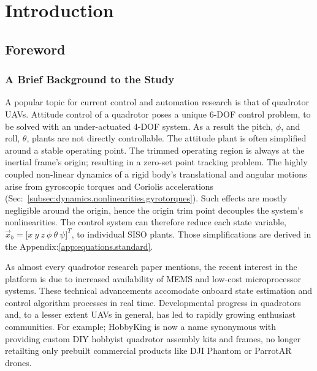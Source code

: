 \chapter{Introduction}
\label{ch:intro}
\section{Foreword}
\label{sec:intro.foreword}
\subsection{A Brief Background to the Study}
\label{subsec:intro.foreword.background}
A popular topic for current control and automation research is that of quadrotor UAVs. Attitude control of a quadrotor poses a unique 6-DOF control problem, to be solved with an under-actuated 4-DOF system. As a result the pitch, $\phi$, and roll, $\theta$, plants are not directly controllable. The attitude plant is often simplified around a stable operating point. The trimmed operating region is always at the inertial frame's origin; resulting in a zero-set point tracking problem. The highly coupled non-linear dynamics of a rigid body's translational and angular motions arise from gyroscopic torques and Coriolis accelerations (Sec:~\ref{subsec:dynamics.nonlinearities.gyrotorques}). Such effects are mostly negligible around the origin, hence the origin trim point decouples the system's nonlinearities. The control system can therefore reduce each state variable, $\vec{x}_b=\big[x~y~z~\phi~\theta~\psi\big]^T$, to individual SISO plants. Those simplifications are derived in the Appendix:\ref{app:equations.standard}.
\par
As almost every quadrotor research paper mentions, the recent interest in the platform is due to increased availability of MEMS and low-cost microprocessor systems. These technical advancements accomodate onboard state estimation and control algorithm processes in real time. Developmental progress in quadrotors and, to a lesser extent UAVs in general, has led to rapidly growing enthusiast communities. For example; HobbyKing\cite{hobbyking} is now a name synonymous with providing custom DIY hobbyist quadrotor assembly kits and frames, no longer retailting only prebuilt commercial products like DJI Phantom\cite{phantom} or ParrotAR\cite{parrotar} drones.
